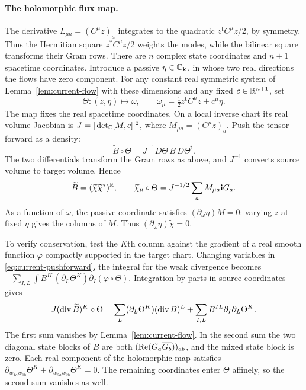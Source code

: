 \paragraph{The holomorphic flux map.}
The derivative $L_{\mu a}=(C^\mu z)_a$ integrates to the quadratic
$z^{\mathsf t}C^\mu z/2$, by symmetry. Thus the Hermitian square
$z^*C^\mu z/2$ weights the modes, while the bilinear square transforms
their Gram rows. There are $n$ complex state coordinates and $n+1$
spacetime coordinates. Introduce a passive $\eta\in\mathbb C_{\mathbf k}$,
in whose two real directions the flows have zero component. For any
constant real symmetric system of Lemma~\ref{lem:current-flow} with
these dimensions and any fixed $c\in\mathbb R^{n+1}$, set
\[
 \Theta:(z,\eta)\longmapsto\omega,
      \qquad \omega_\mu=\tfrac12 z^{\mathsf t}C^\mu z+c^\mu\eta .
\]
The map fixes the real spacetime coordinates. On a local inverse chart
its real volume Jacobian is $J=|\det_{\mathbb C}[M,c]|^2$, where
$M_{\mu a}=(C^\mu z)_a$. Push the tensor forward as a density:
\begin{equation}\label{eq:current-pushforward}
 \widetilde B\circ\Theta=J^{-1}D\Theta\,B\,D\Theta^{\mathsf t}.
\end{equation}
The two differentials transform the Gram rows as above, and $J^{-1}$
converts source volume to target volume. Hence
\begin{equation}\label{eq:current-flux-column}
 \widetilde B=(\widetilde\chi\widetilde\chi^*)^{\mathbb R},\qquad
 \widetilde\chi_\mu\circ\Theta=J^{-1/2}\sum_a M_{\mu a}\mathbf i G_a .
\end{equation}
As a function of $\omega$, the passive coordinate satisfies
$(\partial_\omega\eta)M=0$: varying $z$ at fixed $\eta$ gives the
columns of $M$. Thus $(\partial_\omega\eta)\widetilde\chi=0$.

To verify conservation, test the $K$th column against the gradient of
a real smooth function $\varphi$ compactly supported in the target
chart. Changing variables in \eqref{eq:current-pushforward}, the
integral for the weak divergence becomes
$-\sum_{I,L}\int B^{IL}(\partial_L\Theta^K)\partial_I(\varphi\circ\Theta)$.
Integration by parts in source coordinates gives
\[
 J(\operatorname{div}\widetilde B)^K\circ\Theta
   =\sum_L(\partial_L\Theta^K)(\operatorname{div} B)^L
        +\sum_{I,L}B^{IL}\partial_I\partial_L\Theta^K .
\]
The first sum vanishes by Lemma~\ref{lem:current-flow}. In the second
sum the two diagonal state blocks of $B$ are both
$(\operatorname{Re}(G_a\overline{G_b}))_{ab}$, and the mixed state block is zero.
Each real component of the holomorphic map satisfies
$\partial_{w_{1a}w_{1b}}\Theta^K+
 \partial_{w_{2a}w_{2b}}\Theta^K=0$. The remaining coordinates enter
$\Theta$ affinely, so the second sum vanishes as well.

